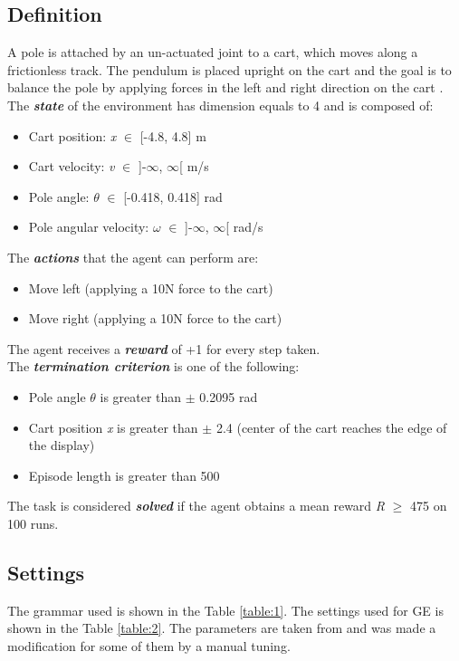 \subsection{Definition}
\label{subsec:411}
A pole is attached by an un-actuated joint to a cart, which moves along a frictionless track. The pendulum is placed upright on the cart and the goal is to balance the pole by applying forces in the left and right direction on the cart \cite{gym} \cite{cartpole}.\\[0.3in]
The \textit{\textbf{state}} of the environment has dimension equals to 4 and is composed of:
\begin{itemize}
    \item Cart position: \textit{x} \(\in\) [-4.8, 4.8] m
    \item Cart velocity: \textit{v} \(\in\) ]-\(\infty\), \(\infty\)[ m/s
    \item Pole angle: \textit{\(\theta\)} \(\in\) [-0.418, 0.418] rad
    \item Pole angular velocity: \textit{\(\omega\)} \(\in\) ]-\(\infty\), \(\infty\)[ rad/s
\end{itemize}
The \textit{\textbf{actions}} that the agent can perform are:
\begin{itemize}
    \item Move left (applying a 10N force to the cart)
    \item Move right (applying a 10N force to the cart)
\end{itemize}
The agent receives a \textit{\textbf{reward}} of +1 for every step taken.\\[0.1in]
The \textit{\textbf{termination criterion}} is one of the following:
\begin{itemize}
    \item Pole angle \textit{$\theta$} is greater than $\pm$ 0.2095 rad
    \item Cart position \textit{x} is greater than $\pm$ 2.4 (center of the cart reaches the edge of the display)
    \item Episode length is greater than 500
\end{itemize}
The task is considered \textit{\textbf{solved}} if the agent obtains a mean reward \textit{R} \(\geq\) 475 on 100 runs.


\subsection{Settings}
\label{subsec:412}
The grammar used is shown in the Table \ref{table:1}. The settings used for GE is shown in the Table \ref{table:2}. The parameters are taken from \cite{custode} and was made a modification for some of them by a manual tuning.
\newpage


